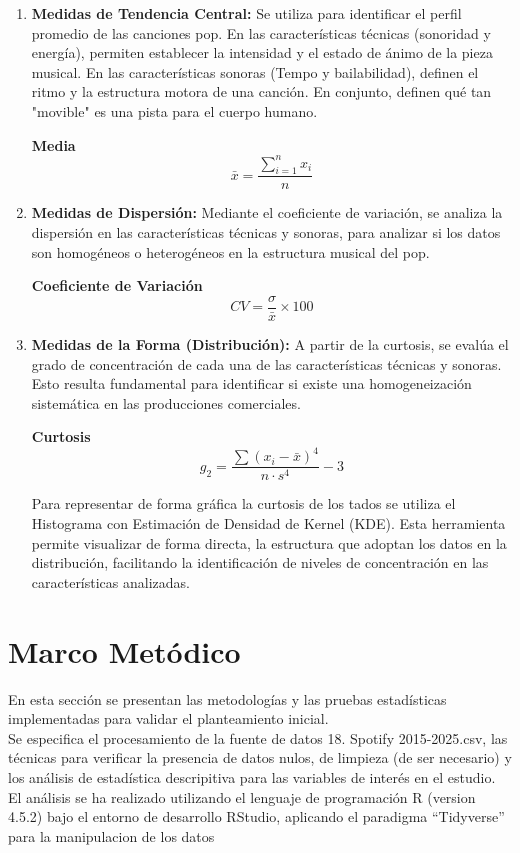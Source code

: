 \documentclass[oneside,11pt]{Latex/Classes/PhDthesisPSnPDF}
\begin{document}
\begin{enumerate}
  \item \textbf{Medidas de Tendencia Central:} Se utiliza para identificar el perfil promedio de las canciones pop. En las características técnicas (sonoridad y energía), permiten establecer la intensidad y el estado de ánimo de la pieza musical. En las características sonoras (Tempo y bailabilidad), definen el ritmo y la estructura motora de una canción. En conjunto, definen qué tan "movible" es una pista para el cuerpo humano.
  
  \textbf{Media}
    $$\bar{x} = \frac{\sum_{i=1}^{n} x_{i}}{n}$$
    \bigskip
 
 \item  \textbf{Medidas de Dispersión:} Mediante el coeficiente de variación, se analiza la dispersión en las características técnicas y sonoras, para analizar si los datos son homogéneos o heterogéneos en la estructura musical del pop.
 
 
 \textbf{Coeficiente de Variación}
$$CV = \frac{\sigma}{\bar{x}} \times 100$$
\bigskip
 
\item \textbf{Medidas de la Forma (Distribución):} A partir de la curtosis, se evalúa el grado de concentración de cada una de las características técnicas y sonoras. Esto resulta fundamental para identificar si existe una homogeneización sistemática en las producciones comerciales.


\textbf{Curtosis}
$$g_2 = \frac{\sum (x_i - \bar{x})^4}{n \cdot s^4} - 3$$
 \bigskip
 
 Para representar de forma gráfica la  curtosis de los tados se utiliza el Histograma con Estimación de Densidad de Kernel (KDE). Esta herramienta permite visualizar de forma directa, la estructura que adoptan los datos en la distribución, facilitando la identificación de niveles de concentración en las características analizadas.
\end{enumerate}

\chapter{Marco Metódico}

En esta sección se presentan las metodologías y las pruebas estadísticas
implementadas para validar el planteamiento inicial.\\
Se especifica el procesamiento de la fuente de datos 18. Spotify
2015-2025.csv, las técnicas para verificar la presencia de datos nulos,
de limpieza (de ser necesario) y los análisis de estadística
descripitiva para las variables de interés en el estudio.\\
El análisis se ha realizado utilizando el lenguaje de programación R
(version 4.5.2) bajo el entorno de desarrollo RStudio, aplicando el
paradigma ``Tidyverse'' para la manipulacion de los datos\\
\end{document}
